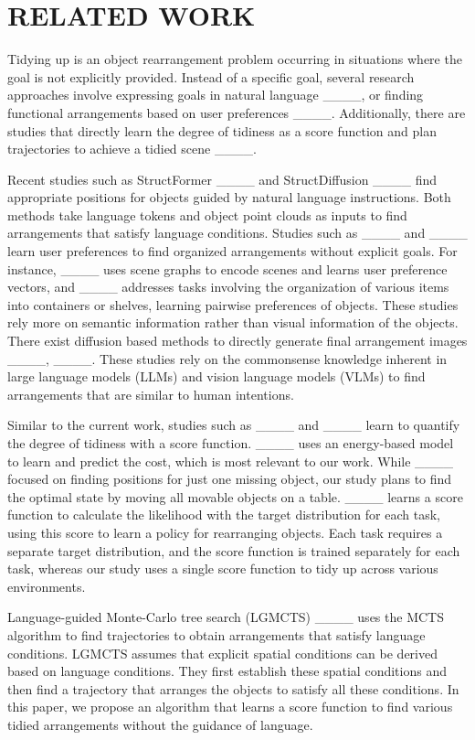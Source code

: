 \section{RELATED WORK}
Tidying up is an object rearrangement problem occurring in situations where the goal is not explicitly provided. 
Instead of a specific goal, several research approaches involve expressing goals in natural language ____, 
or finding functional arrangements based on user preferences ____.
Additionally, there are studies that directly learn the degree of tidiness as a score function and plan trajectories to achieve a tidied scene ____.

Recent studies such as StructFormer ____ and StructDiffusion ____ find appropriate positions for objects guided by natural language instructions. 
Both methods take language tokens and object point clouds as inputs to find arrangements that satisfy language conditions. 
Studies such as ____ and ____ learn user preferences to find organized arrangements without explicit goals.
For instance, ____ uses scene graphs to encode scenes and learns user preference vectors, 
and ____ addresses tasks involving the organization of various items into containers or shelves, learning pairwise preferences of objects. %
These studies rely more on semantic information rather than visual information of the objects.
There exist diffusion based methods to directly generate final arrangement images ____, ____.
These studies rely on the commonsense knowledge inherent in large language models (LLMs) and vision language models (VLMs) to find arrangements that are similar to human intentions. 

Similar to the current work, studies such as ____ and ____ learn to quantify the degree of tidiness with a score function. 
____ uses an energy-based model to learn and predict the cost, which is most relevant to our work. 
While ____ focused on finding positions for just one missing object, our study plans to find the optimal state by moving all movable objects on a table. 
____ learns a score function to calculate the likelihood with the target distribution for each task, using this score to learn a policy for rearranging objects. 
Each task requires a separate target distribution, and the score function is trained separately for each task, whereas our study uses a single score function to tidy up across various environments.

Language-guided Monte-Carlo tree search (LGMCTS) ____ uses the MCTS algorithm to find trajectories to obtain arrangements that satisfy language conditions. 
LGMCTS assumes that explicit spatial conditions can be derived based on language conditions. 
They first establish these spatial conditions and then find a trajectory that arranges the objects to satisfy all these conditions. 
In this paper, we propose an algorithm that learns a score function to find various tidied arrangements without the guidance of language.